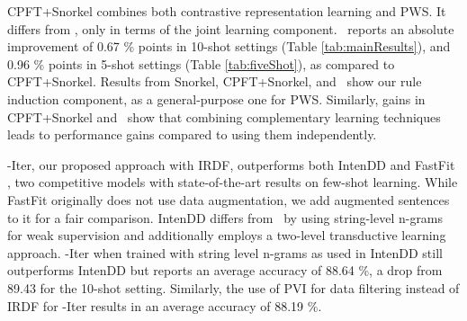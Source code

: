CPFT+Snorkel combines both contrastive representation learning and PWS. It differs from \our, only in terms of the joint learning component. \our~reports an absolute improvement of 0.67 \% points in 10-shot settings (Table \ref{tab:mainResults}), and 0.96 \% points  in 5-shot settings (Table \ref{tab:fiveShot}), as compared to CPFT+Snorkel. %
Results from Snorkel, CPFT+Snorkel, and \our~show our rule induction component, as a general-purpose one for PWS. Similarly, gains in CPFT+Snorkel and \our~show that combining complementary learning techniques leads to performance gains compared to using them independently.  


\our-Iter, our proposed approach with IRDF, %
outperforms both IntenDD \cite{singhal-etal-2023-intendd} and FastFit \cite{yehudai2024llms}, two competitive models with state-of-the-art results on few-shot learning. While FastFit originally does not use data augmentation, we add augmented sentences to it for a fair comparison. IntenDD differs from \our~by using string-level n-grams for weak supervision and additionally employs a two-level transductive learning approach. \our-Iter when trained with string level n-grams as used in IntenDD still outperforms IntenDD but reports an average accuracy of 88.64 \%, a drop from 89.43 for the 10-shot setting. Similarly, the use of PVI for data filtering instead of IRDF for \our-Iter results in an average accuracy of 88.19 \%.






